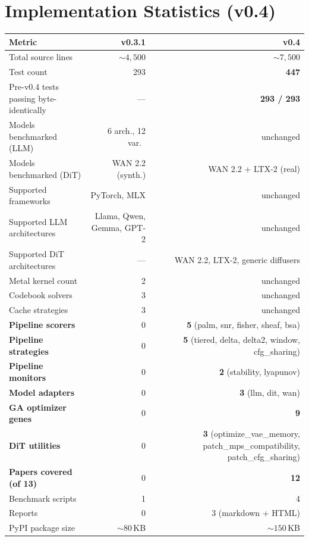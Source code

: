 \documentclass[11pt,a4paper]{article}
\begin{document}
\section{Implementation Statistics (v0.4)}\label{app:stats}

\begin{table}[h]
\centering
\begin{tabular}{lrr}
\toprule
\textbf{Metric} & \textbf{v0.3.1} & \textbf{v0.4} \\
\midrule
Total source lines                & ${\sim}4{,}500$ & ${\sim}7{,}500$ \\
Test count                        & 293 & \textbf{447} \\
Pre-v0.4 tests passing byte-identically & --- & \textbf{293 / 293} \\
Models benchmarked (LLM)          & 6 arch., 12 var.\ & unchanged \\
Models benchmarked (DiT)          & WAN 2.2 (synth.) & WAN 2.2 + LTX-2 (real) \\
Supported frameworks              & PyTorch, MLX & unchanged \\
Supported LLM architectures       & Llama, Qwen, Gemma, GPT-2 & unchanged \\
Supported DiT architectures       & --- & WAN 2.2, LTX-2, generic diffusers \\
Metal kernel count                & 2 & unchanged \\
Codebook solvers                  & 3 & unchanged \\
Cache strategies                  & 3 & unchanged \\
\textbf{Pipeline scorers}         & 0 & \textbf{5} (palm, snr, fisher, sheaf, bsa) \\
\textbf{Pipeline strategies}      & 0 & \textbf{5} (tiered, delta, delta2, window, cfg\_sharing) \\
\textbf{Pipeline monitors}        & 0 & \textbf{2} (stability, lyapunov) \\
\textbf{Model adapters}           & 0 & \textbf{3} (llm, dit, wan) \\
\textbf{GA optimizer genes}       & 0 & \textbf{9} \\
\textbf{DiT utilities}            & 0 & \textbf{3} (optimize\_vae\_memory, patch\_mps\_compatibility, patch\_cfg\_sharing) \\
\textbf{Papers covered (of 13)}   & 0 & \textbf{12} \\
Benchmark scripts                 & 1 & 4 \\
Reports                           & 0 & 3 (markdown + HTML) \\
PyPI package size                 & ${\sim}80$\,KB & ${\sim}150$\,KB \\
\bottomrule
\end{tabular}
\end{table}
\end{document}
